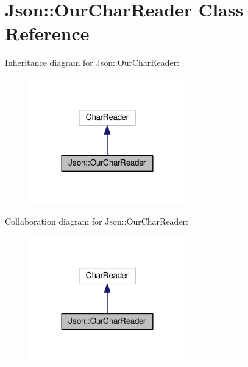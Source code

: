 \hypertarget{class_json_1_1_our_char_reader}{}\section{Json\+:\+:Our\+Char\+Reader Class Reference}
\label{class_json_1_1_our_char_reader}


Inheritance diagram for Json\+:\+:Our\+Char\+Reader\+:
\nopagebreak
\begin{figure}[H]
\begin{center}
\leavevmode
\includegraphics[width=192pt]{class_json_1_1_our_char_reader__inherit__graph}
\end{center}
\end{figure}


Collaboration diagram for Json\+:\+:Our\+Char\+Reader\+:
\nopagebreak
\begin{figure}[H]
\begin{center}
\leavevmode
\includegraphics[width=192pt]{class_json_1_1_our_char_reader__coll__graph}
\end{center}
\end{figure}
